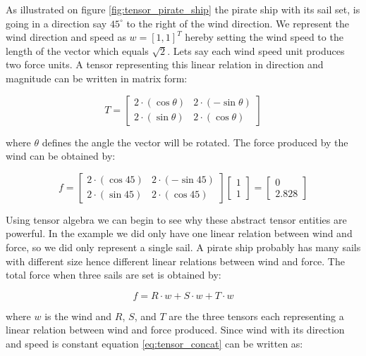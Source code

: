 As illustrated on figure \vref{fig:tensor_pirate_ship} the pirate ship with its sail set, is
going in a direction say $45^\circ$ to the right of the wind
direction. We represent the wind direction and speed as $w =
[1,1]^T$ hereby setting the wind speed to the length of the vector
which equals $\sqrt{2}$. Lets say each wind speed unit produces two force 
units. A tensor representing this linear relation in direction and
magnitude can be written in matrix form:

\begin{equation}
T = \begin{bmatrix} 
2 \cdot (\cos \theta) & 2 \cdot (-\sin \theta) \\ 
2 \cdot (\sin \theta) & 2 \cdot (\cos \theta) 
\end{bmatrix} 
\end{equation}

where $\theta$ defines the angle the vector will be rotated.
The force produced by the wind can be obtained by:

\begin{equation}
f = 
\begin{bmatrix} 
2 \cdot (\cos 45) & 2 \cdot (-\sin 45) \\ 
2 \cdot (\sin 45) & 2 \cdot (\cos 45) 
\end{bmatrix} 
\begin{bmatrix} 
1 \\ 1
\end{bmatrix} 
=
\begin{bmatrix}
0 \\ 2.828 
\end{bmatrix} 
\end{equation}

Using tensor algebra we can begin to see why these abstract tensor
entities are powerful. In the example we did only have one linear
relation between wind and force, so we did only represent a single sail. A pirate ship
probably has many sails with different size hence different linear
relations between wind and force. The total force when three sails are
set is obtained by:

\begin{equation}
\label{eq:tensor_concat}
f = R \cdot w + S \cdot w + T \cdot w
\end{equation}

where $w$ is the wind and $R$, $S$, and $T$ are the three tensors each representing a linear
relation between wind and force produced.
Since wind with its direction and speed is constant equation
\eqref{eq:tensor_concat} can be written as:

